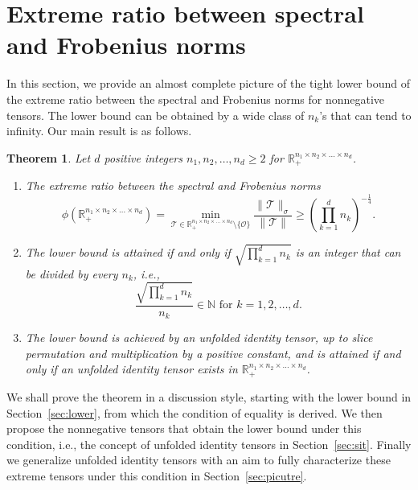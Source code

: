 \documentclass[11pt]{article}
\newtheorem{theorem}{Theorem}[section]
\newcommand{\R}{\mathbb{R}}
\newcommand{\N}{\mathbb{N}}
\newcommand{\OO}{\mathcal{O}}
\newcommand{\TT}{\mathcal{T}}
\begin{document}
\section{Extreme ratio between spectral and Frobenius norms} \label{sec:main}

In this section, we provide an almost complete picture of the tight lower bound of the extreme ratio between the spectral and Frobenius norms for nonnegative tensors. The lower bound can be obtained by a wide class of $n_k$'s that can tend to infinity. Our main result is as follows.

\begin{theorem}\label{thm:main}
Let $d$ positive integers $n_1,n_2,\dots,n_d\ge2$ for $\R_+^{n_1\times n_2\times\dots\times n_d}$.
\begin{enumerate}
\item The extreme ratio between the spectral and Frobenius norms
  \begin{equation}\label{eq:main}
    \phi(\R_+^{n_1\times n_2\times\dots\times n_d})
    =\min_{\TT\in\R_+^{n_1\times n_2\times\dots\times n_d}\setminus\{\OO\}} \frac{\|\TT\|_\sigma}{\|\TT\|}
    \ge \left(\prod_{k=1}^dn_k\right)^{-\frac{1}{4}}.
  \end{equation}
\item The lower bound is attained if and only if $\sqrt{\prod_{k=1}^dn_k}$ is an integer that can be divided by every $n_k$, i.e.,
\begin{equation}\label{eq:condition}
\frac{\sqrt{\prod_{k=1}^dn_k}}{n_k}\in\N \mbox{ for }k=1,2,\dots,d.
\end{equation}
\item The lower bound is achieved by an unfolded identity tensor, up to slice permutation and multiplication by a positive constant, and is attained if and only if an unfolded identity tensor exists in $\R_+^{n_1\times n_2\times\dots\times n_d}$.
\end{enumerate}
\end{theorem}

We shall prove the theorem in a discussion style, starting with the lower bound in Section~\ref{sec:lower}, from which the condition of equality is derived. We then propose the nonnegative tensors that obtain the lower bound under this condition, i.e., the concept of unfolded identity tensors in Section~\ref{sec:sit}. Finally  we generalize unfolded identity tensors with an aim to fully characterize these extreme tensors under this condition in Section~\ref{sec:picutre}.
\end{document}
